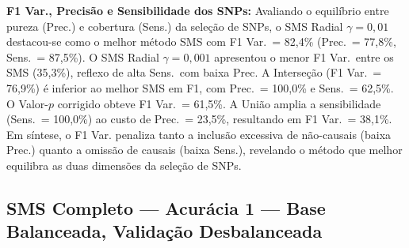 \documentclass[12pt,a4paper]{article}
\newcommand{\novo}[1]{\textcolor{corNova}{#1}}
\begin{document}
\novo{\textbf{F1 Var., Precisão e Sensibilidade dos SNPs:} Avaliando o equilíbrio entre pureza (Prec.) e cobertura (Sens.) da seleção de SNPs, o SMS Radial $\gamma=0{,}01$ destacou-se como o melhor método SMS com F1 Var.\ = 82,4\% (Prec.\ = 77,8\%, Sens.\ = 87,5\%). O SMS Radial $\gamma=0{,}001$ apresentou o menor F1 Var.\ entre os SMS (35,3\%), reflexo de alta Sens.\ com baixa Prec. A Interseção (F1 Var.\ = 76,9\%) é inferior ao melhor SMS em F1, com Prec.\ = 100,0\% e Sens.\ = 62,5\%. O Valor-$p$ corrigido obteve F1 Var.\ = 61,5\%. A União amplia a sensibilidade (Sens.\ = 100,0\%) ao custo de Prec.\ = 23,5\%, resultando em F1 Var.\ = 38,1\%. Em síntese, o F1 Var. penaliza tanto a inclusão excessiva de não-causais (baixa Prec.) quanto a omissão de causais (baixa Sens.), revelando o método que melhor equilibra as duas dimensões da seleção de SNPs.}
\subsection{SMS Completo --- Acurácia 1 --- Base Balanceada, Validação Desbalanceada}
\end{document}
